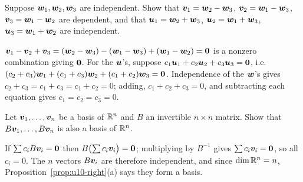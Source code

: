 \begin{exercise}\label{exr:u10-wdep}
Suppose $\boldsymbol{w}_1,\boldsymbol{w}_2,\boldsymbol{w}_3$ are independent. Show that $\boldsymbol{v}_1=\boldsymbol{w}_2-\boldsymbol{w}_3$,
$\boldsymbol{v}_2=\boldsymbol{w}_1-\boldsymbol{w}_3$, $\boldsymbol{v}_3=\boldsymbol{w}_1-\boldsymbol{w}_2$ are dependent, and that
$\boldsymbol{u}_1=\boldsymbol{w}_2+\boldsymbol{w}_3$, $\boldsymbol{u}_2=\boldsymbol{w}_1+\boldsymbol{w}_3$, $\boldsymbol{u}_3=\boldsymbol{w}_1+\boldsymbol{w}_2$ are
independent.
\end{exercise}
\begin{solution}
$\boldsymbol{v}_1-\boldsymbol{v}_2+\boldsymbol{v}_3=(\boldsymbol{w}_2-\boldsymbol{w}_3)-(\boldsymbol{w}_1-\boldsymbol{w}_3)+(\boldsymbol{w}_1-\boldsymbol{w}_2)=\boldsymbol{0}$ is a
nonzero combination giving $\boldsymbol{0}$. For the $\boldsymbol{u}$'s, suppose
$c_1\boldsymbol{u}_1+c_2\boldsymbol{u}_2+c_3\boldsymbol{u}_3=\boldsymbol{0}$, i.e.
$(c_2+c_3)\boldsymbol{w}_1+(c_1+c_3)\boldsymbol{w}_2+(c_1+c_2)\boldsymbol{w}_3=\boldsymbol{0}$. Independence of the $\boldsymbol{w}$'s gives
$c_2+c_3=c_1+c_3=c_1+c_2=0$; adding, $c_1+c_2+c_3=0$, and subtracting each equation gives
$c_1=c_2=c_3=0$.
\end{solution}

\begin{exercise}\label{exr:u10-invertible}
Let $\boldsymbol{v}_1,\dots,\boldsymbol{v}_n$ be a basis of $\mathbb{R}^n$ and $B$ an invertible $n\times n$ matrix. Show
that $B\boldsymbol{v}_1,\dots,B\boldsymbol{v}_n$ is also a basis of $\mathbb{R}^n$.
\end{exercise}
\begin{solution}
If $\sum c_iB\boldsymbol{v}_i=\boldsymbol{0}$ then $B\bigl(\sum c_i\boldsymbol{v}_i\bigr)=\boldsymbol{0}$; multiplying by $B^{-1}$
gives $\sum c_i\boldsymbol{v}_i=\boldsymbol{0}$, so all $c_i=0$. The $n$ vectors $B\boldsymbol{v}_i$ are therefore
independent, and since $\dim\mathbb{R}^n=n$, Proposition~\ref{prop:u10-right}(a) says they form a basis.
\end{solution}
